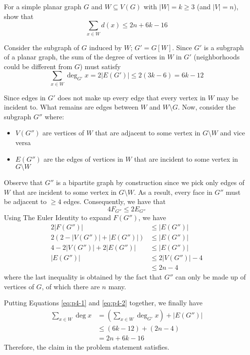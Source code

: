\question For a simple planar graph \(G\) and \(W \subseteq
V(G)\) with \(|W| = k \geq 3\) (and \(|V|=n\)), show that
\[ \sum_{x \in W} d(x) \leq 2n + 6 k - 16 \]

\begin{solution}
  Consider the subgraph of \(G\) induced by \(W\); \(G' = G[W]\). Since \(G'\)
  is a subgraph of a planar graph, the sum of the degree of vertices in \(W\) in
  \(G'\) (neighborhoods could be different from \(G\)) must satisfy
  \begin{equation}
    \sum_{x \in W} \deg_{G'} x = 2|E(G')| \leq 2(3k - 6) = 6k - 12
    \label{eq:p4-1}
  \end{equation}

  Since edges in \(G'\) does not make up every edge that every
  vertex in \(W\) may be incident to. What remains are edges between \(W\) and
  \(W \setminus G\). Now, consider the subgraph \(G''\) where:
  \begin{itemize}
    \item \(V(G'')\) are vertices of \(W\) that are adjacent to some
      vertex in \(G \setminus W\) and vice versa
    \item \(E(G'')\) are the edges of vertices in \(W\) that are incident to
      some vertex in \(G \setminus W\)
  \end{itemize}
  Observe that \(G''\) is a bipartite graph by construction since we pick only
  edges of \(W\) that are incident to some vertex in \(G \setminus W\). As a
  result, every face in \(G''\) must be adjacent to \(\geq4\) edges.
  Consequently, we have that
  \[ 4F_{G''} \leq 2E_{G''} \]
  Using The Euler Identity to expand \(F(G'')\), we have
  \begin{equation}
    \begin{aligned}
      2|F(G'')| &\leq |E(G'')| \\
      2(2 - |V(G'')| + |E(G'')|) &\leq |E(G'')| \\ 
      4 - 2|V(G'')| + 2|E(G'')| &\leq |E(G'')| \\ 
      |E(G'')| &\leq 2|V(G'')| - 4 \\
              &\leq 2n - 4
    \end{aligned}
    \label{eq:p4-2}
  \end{equation}
  where the last inequality is obtained by the fact that \(G''\) can only be
  made up of vertices of \(G\), of which there are \(n\) many.

  Putting Equations \ref{eq:p4-1} and \ref{eq:p4-2} together, we finally have
  \[
    \begin{aligned}
      \sum_{x \in W} \deg x &= \left(\sum_{x \in W} \deg_{G'} x\right) + |E(G'')| \\
                            &\leq (6k - 12) + (2n - 4) \\
                            &= 2n + 6k - 16
    \end{aligned}
  \]
  Therefore, the claim in the problem statement satisfies.
\end{solution}
